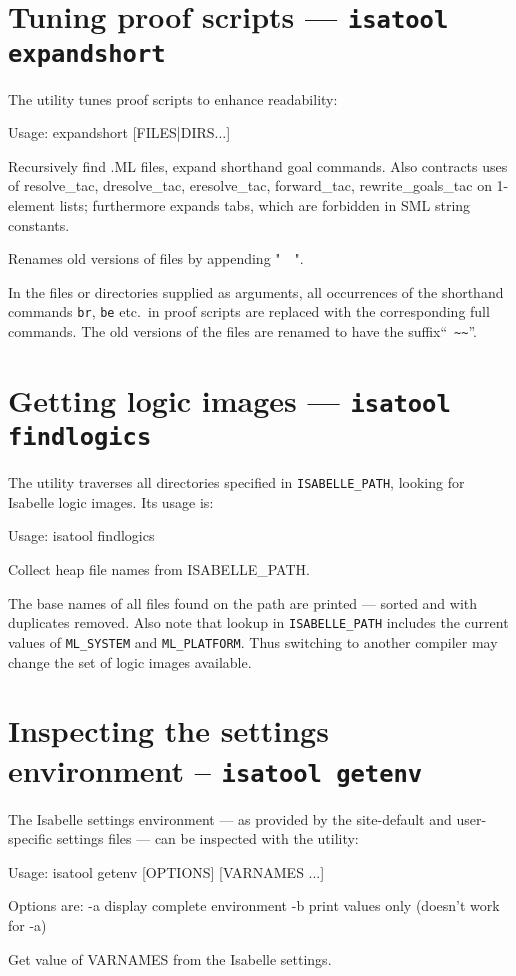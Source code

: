 \section{Tuning proof scripts --- \texttt{isatool expandshort}}

The  utility tunes {\ML} proof scripts to enhance
readability:
\begin{ttbox}
Usage: expandshort [FILES|DIRS...]

  Recursively find .ML files, expand shorthand goal commands.  Also
  contracts uses of resolve_tac, dresolve_tac, eresolve_tac,
  forward_tac, rewrite_goals_tac on 1-element lists; furthermore
  expands tabs, which are forbidden in SML string constants.

  Renames old versions of files by appending "~~".
\end{ttbox}
In the files or directories supplied as arguments, all occurrences of the
shorthand commands \texttt{br}, \texttt{be} etc.\ in proof scripts are
replaced with the corresponding full commands.  The old versions of the files
are renamed to have the suffix``~\verb'~~'''.


\section{Getting logic images --- \texttt{isatool findlogics}}

The  utility traverses all directories specified in
\texttt{ISABELLE_PATH}, looking for Isabelle logic images. Its usage is:
\begin{ttbox}
Usage: isatool findlogics

  Collect heap file names from ISABELLE_PATH.
\end{ttbox}
The base names of all files found on the path are printed --- sorted and with
duplicates removed. Also note that lookup in \texttt{ISABELLE_PATH} includes
the current values of \texttt{ML_SYSTEM} and \texttt{ML_PLATFORM}. Thus
switching to another {\ML} compiler may change the set of logic images
available.


\section{Inspecting the settings environment -- \texttt{isatool getenv}}
\label{sec:tool-getenv}

The Isabelle settings environment --- as provided by the site-default and
user-specific settings files --- can be inspected with the 
utility:
\begin{ttbox}
Usage: isatool getenv [OPTIONS] [VARNAMES ...]

  Options are:
    -a           display complete environment
    -b           print values only (doesn't work for -a)

  Get value of VARNAMES from the Isabelle settings.
\end{ttbox}

